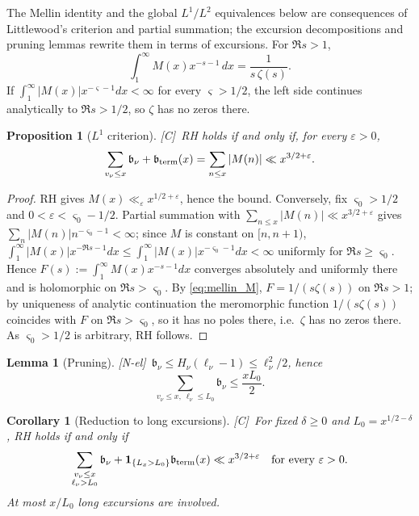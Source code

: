 \documentclass[11pt,reqno]{amsart}
\numberwithin{equation}{section}
\theoremstyle{plain}
\newtheorem{proposition}[theorem]{Proposition}
\newtheorem{lemma}[theorem]{Lemma}
\newtheorem{corollary}[theorem]{Corollary}
\theoremstyle{definition}
\theoremstyle{remark}
\newcommand{\eps}{\varepsilon}
\newcommand{\tagNE}{\textup{[N-el]}}
\newcommand{\tagC}{\textup{[C]}}
\begin{document}
The Mellin identity and the global $L^1/L^2$ equivalences below are
consequences of Littlewood's criterion and partial summation; the excursion
decompositions and pruning lemmas rewrite them in terms of excursions.
For $\Re s>1$,
\begin{equation}
\label{eq:mellin_M}
  \int_1^\infty M(x)x^{-s-1}\,dx=\frac{1}{s\,\zeta(s)} .
\end{equation}
If $\int_1^\infty|M(x)|x^{-\varsigma-1}dx<\infty$ for every $\varsigma>1/2$, the
left side continues analytically to $\Re s>1/2$, so $\zeta$ has no zeros
there.

\begin{proposition}[$L^1$ criterion]
\label{prop:L1}
\tagC\ RH holds if and only if, for every $\eps>0$,
\begin{equation}
\label{eq:L1_criterion}
  \sum_{v_\nu\le x}\mathfrak b_\nu+\mathfrak b_{\rm term}(x)=\sum_{n\le x}|M(n)|
  \ll x^{3/2+\eps}.
\end{equation}
\end{proposition}

\begin{proof}
RH gives $M(x)\ll_\eps x^{1/2+\eps}$, hence the bound. Conversely, fix
$\varsigma_0>1/2$ and $0<\eps<\varsigma_0-1/2$. Partial summation with
$\sum_{n\le x}|M(n)|\ll x^{3/2+\eps}$ gives
$\sum_n|M(n)|n^{-\varsigma_0-1}<\infty$; since $M$ is constant on
$[n,n+1)$, $\int_1^\infty|M(x)|x^{-\Re s-1}dx\le\int_1^\infty|M(x)|x^{-\varsigma_0-1}dx<\infty$
uniformly for $\Re s\ge\varsigma_0$. Hence $F(s):=\int_1^\infty M(x)x^{-s-1}dx$
converges absolutely and uniformly there and is holomorphic on
$\Re s>\varsigma_0$. By \eqref{eq:mellin_M}, $F=1/(s\zeta(s))$
on $\Re s>1$; by uniqueness of analytic continuation the meromorphic function
$1/(s\zeta(s))$ coincides with $F$ on $\Re s>\varsigma_0$, so it has no poles
there, i.e.\ $\zeta$ has no zeros there. As $\varsigma_0>1/2$ is arbitrary,
RH follows.
\end{proof}

\begin{lemma}[Pruning]
\label{lem:pruning}
\tagNE\ $\mathfrak b_\nu\le H_\nu(\ell_\nu-1)\le\ell_\nu^2/2$, hence
\begin{equation}
\label{eq:pruning}
  \sum_{v_\nu\le x,\ \ell_\nu\le L_0}\mathfrak b_\nu\le\frac{xL_0}{2}.
\end{equation}
\end{lemma}

\begin{corollary}[Reduction to long excursions]
\label{cor:long}
\tagC\ For fixed $\delta\ge0$ and $L_0=x^{1/2-\delta}$, RH holds if and only if
\begin{equation}
\label{eq:long_reduction}
  \sum_{\substack{v_\nu\le x\\ \ell_\nu>L_0}}\mathfrak b_\nu
  +\mathbf 1_{\{L_x>L_0\}}\mathfrak b_{\rm term}(x)\ll x^{3/2+\eps}
  \quad\text{for every }\eps>0.
\end{equation}
At most $x/L_0$ long excursions are involved.
\end{corollary}
\end{document}
